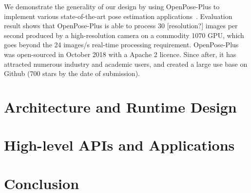 \documentclass[twoside,11pt]{article}
\begin{document}
We demonstrate the generality of our design by using OpenPose-Plus 
to implement various
state-of-the-art pose estimation applications~\citep{x1, x2, x3}.
Evaluation result shows that
OpenPose-Plus is able to process 30 [resolution?] images per second
produced by a high-resolution camera on a commodity 1070 GPU,
which goes beyond the 24 images/s real-time processing requirement.
OpenPose-Plus was open-sourced in October 2018 with a 
Apache 2 licence. Since after, it has attracted numerous 
industry and academic users, and created a large use base on Github (700 stars by the date of submission). 

\section{Architecture and Runtime Design}

\section{High-level APIs and Applications}

\section{Conclusion}




\end{document}
